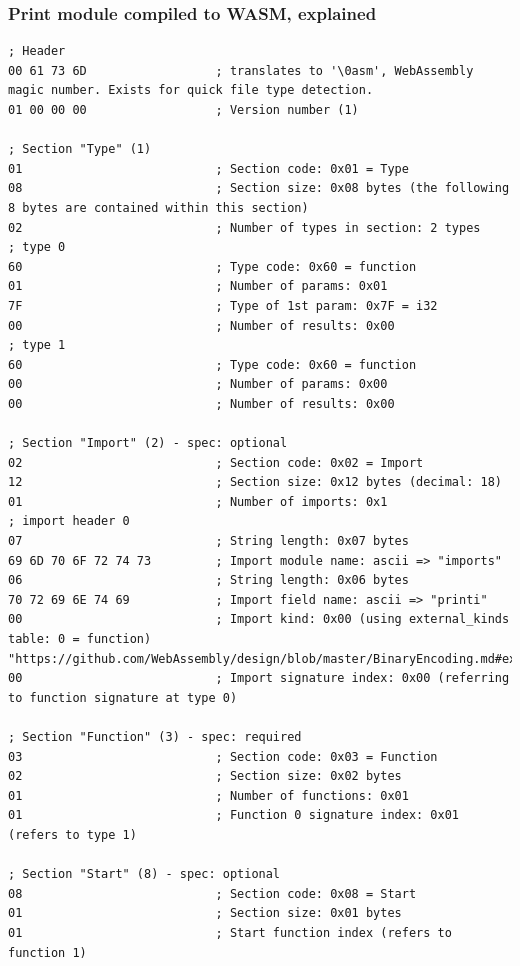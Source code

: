 \documentclass[a4paper]{article}
\begin{document}
\subsubsection{Print module compiled to WASM, explained}
\label{sec:appendix:wasm-examples:binary-print}
\begin{verbatim}
; Header
00 61 73 6D                  ; translates to '\0asm', WebAssembly magic number. Exists for quick file type detection.
01 00 00 00                  ; Version number (1)

; Section "Type" (1)
01                           ; Section code: 0x01 = Type
08                           ; Section size: 0x08 bytes (the following 8 bytes are contained within this section)
02                           ; Number of types in section: 2 types
; type 0
60                           ; Type code: 0x60 = function
01                           ; Number of params: 0x01
7F                           ; Type of 1st param: 0x7F = i32
00                           ; Number of results: 0x00
; type 1
60                           ; Type code: 0x60 = function
00                           ; Number of params: 0x00
00                           ; Number of results: 0x00

; Section "Import" (2) - spec: optional
02                           ; Section code: 0x02 = Import
12                           ; Section size: 0x12 bytes (decimal: 18)
01                           ; Number of imports: 0x1
; import header 0
07                           ; String length: 0x07 bytes
69 6D 70 6F 72 74 73         ; Import module name: ascii => "imports"
06                           ; String length: 0x06 bytes
70 72 69 6E 74 69            ; Import field name: ascii => "printi"
00                           ; Import kind: 0x00 (using external_kinds table: 0 = function) "https://github.com/WebAssembly/design/blob/master/BinaryEncoding.md#external_kind"
00                           ; Import signature index: 0x00 (referring to function signature at type 0)

; Section "Function" (3) - spec: required
03                           ; Section code: 0x03 = Function
02                           ; Section size: 0x02 bytes
01                           ; Number of functions: 0x01
01                           ; Function 0 signature index: 0x01 (refers to type 1)

; Section "Start" (8) - spec: optional
08                           ; Section code: 0x08 = Start
01                           ; Section size: 0x01 bytes
01                           ; Start function index (refers to function 1)


\end{verbatim}
\end{document}
